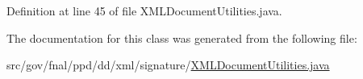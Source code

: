 Definition at line 45 of file X\-M\-L\-Document\-Utilities.\-java.



The documentation for this class was generated from the following file\-:\begin{DoxyCompactItemize}
\item 
src/gov/fnal/ppd/dd/xml/signature/\hyperlink{XMLDocumentUtilities_8java}{X\-M\-L\-Document\-Utilities.\-java}\end{DoxyCompactItemize}
